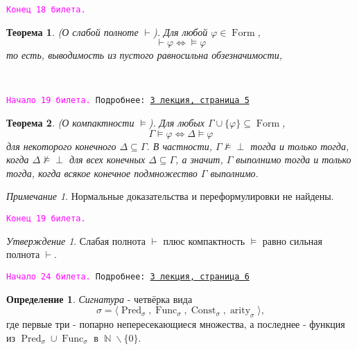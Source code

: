 \documentclass[a4paper,100pt]{article}
\theoremstyle{indented}
\newtheorem{theorem}{Теорема}
\theoremstyle{definition}
\newtheorem{defn}{Определение}
\theoremstyle{remark}
\newtheorem{remark}{Примечание}
\newtheorem{stat}{Утверждение}
\DeclareMathOperator{\Llra}{\Longleftrightarrow}
\DeclareMathOperator{\NN}{\mathbb{N}}
\DeclareMathOperator{\form}{Form}
\DeclareMathOperator{\Pred}{Pred}
\DeclareMathOperator{\Func}{Func}
\DeclareMathOperator{\Const}{Const}
\DeclareMathOperator{\arity}{arity}
\begin{document}
\texttt{\textcolor{magenta}{Конец 18 билета.}} 

\hrulefill

\begin{theorem}
  (О слабой полноте $\vdash$). Для любой $\varphi \in \form$, 
  \[
    \vdash \varphi \Llra \vDash \varphi
  \]
  то есть, выводимость из пустого равносильна обзезначимости,
\end{theorem}\ 

\hrulefill

\texttt{\hypertarget{b19}{\textcolor{magenta}{Начало 19 билета.}} Подробнее: \href{http://www.mi-ras.ru/~speranski/courses/logic-1-2021-spring/slides_3.pdf}{3 лекция, страница 5}} \\

\begin{theorem}
  (О компактности $\vDash$). Для любых $\Gamma \cup \{\varphi\}\subseteq \form$, 
  \[
    \Gamma \vDash \varphi \Llra \Delta \vDash \varphi
  \]
  для некоторого конечного $\Delta \subseteq \Gamma$. В частности, $\Gamma \nvDash \perp$ тогда и только тогда, когда $\Delta \nvDash \perp$ для всех конечных $\Delta \subseteq \Gamma$, а значит, $\Gamma$ выполнимо тогда и только тогда, когда всякое конечное подмножество $\Gamma $ выполнимо.
\end{theorem}

\begin{remark}
  Нормальные доказательства и переформулировки не найдены.
\end{remark}

\texttt{\textcolor{magenta}{Конец 19 билета.}} 

\hrulefill

\begin{stat}
  Слабая полнота $\vdash$ плюс компактность $\vDash$ равно сильная полнота $\vdash$. 
\end{stat}

\hrulefill

\texttt{\hypertarget{b24}{\textcolor{magenta}{Начало 24 билета.}} Подробнее: \href{http://www.mi-ras.ru/~speranski/courses/logic-1-2021-spring/slides_3.pdf}{3 лекция, страница 6}} \\

\begin{defn}
  \textit{Сигнатура} - четвёрка вида 
  \[
    \sigma = \langle \Pred_\sigma, \Func_\sigma, \Const_\sigma, \arity_\sigma \rangle,
  \]
  где первые три - попарно непересекающиеся множества, а последнее - функция из $\Pred_\sigma \cup \Func_\sigma$ в $\NN\backslash \{0\}$. 
\end{defn}
\end{document}
